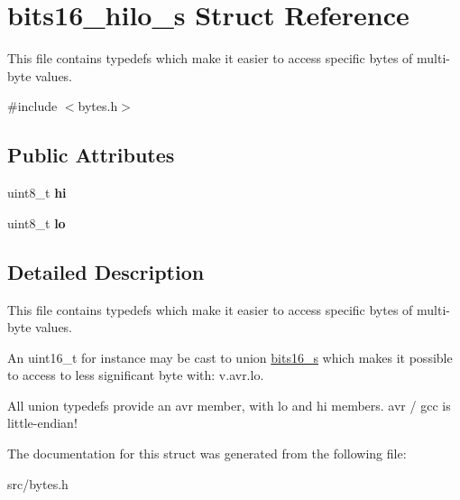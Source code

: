 \hypertarget{structbits16__hilo__s}{}\section{bits16\+\_\+hilo\+\_\+s Struct Reference}
\label{structbits16__hilo__s}


This file contains {\ttfamily typedef}s which make it easier to access specific bytes of multi-\/byte values.  




{\ttfamily \#include $<$bytes.\+h$>$}

\subsection*{Public Attributes}
\begin{DoxyCompactItemize}
\item 
\hypertarget{structbits16__hilo__s_a98071eaa0aa7ced793222f30fa7955e4}{}\label{structbits16__hilo__s_a98071eaa0aa7ced793222f30fa7955e4} 
uint8\+\_\+t {\bfseries hi}
\item 
\hypertarget{structbits16__hilo__s_ab3f69ba4a390e1db439cf56708ecc799}{}\label{structbits16__hilo__s_ab3f69ba4a390e1db439cf56708ecc799} 
uint8\+\_\+t {\bfseries lo}
\end{DoxyCompactItemize}


\subsection{Detailed Description}
This file contains {\ttfamily typedef}s which make it easier to access specific bytes of multi-\/byte values. 

An {\ttfamily uint16\+\_\+t} for instance may be cast to {\ttfamily union \hyperlink{unionbits16__s}{bits16\+\_\+s}} which makes it possible to access to less significant byte with\+: {\ttfamily v.\+avr.\+lo}.

All {\ttfamily union} {\ttfamily typedef}s provide an {\ttfamily avr} member, with {\ttfamily lo} and {\ttfamily hi} members. {\ttfamily avr} / gcc is little-\/endian! 

The documentation for this struct was generated from the following file\+:\begin{DoxyCompactItemize}
\item 
src/bytes.\+h\end{DoxyCompactItemize}
